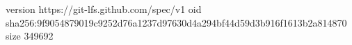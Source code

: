 version https://git-lfs.github.com/spec/v1
oid sha256:9f9054879019c9252d76a1237d97630d4a294bf44d59d3b916f1613b2a814870
size 349692

